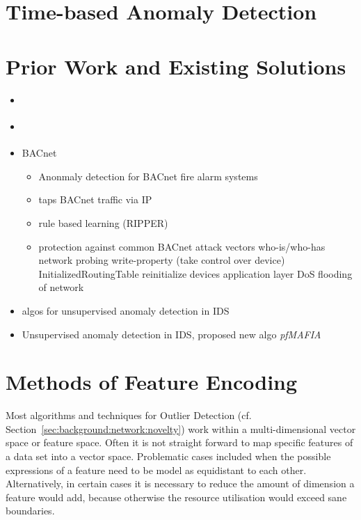 \section{Time-based Anomaly Detection}

\section{Prior Work and Existing Solutions}
\label{sec:background:network:priorwork}

\begin{itemize}
	\item \parencite{Yang2006}
	\item \parencite{Celeda2012}
	\item \textcite{Pan2014} BACnet
		\begin{itemize}
			\item Anonmaly detection for BACnet fire alarm systems
			\item taps BACnet traffic via IP
			\item rule based learning (RIPPER)
			\item protection against common BACnet attack vectors
				\subitem who-is/who-has network probing
				\subitem write-property (take control over device)
				\subitem InitializedRoutingTable
				\subitem reinitialize devices
				\subitem application layer DoS
				\subitem flooding of network
		\end{itemize}
	
	\item \textcite{Eskin2002} algos for unsupervised anomaly detection in IDS
	\item \textcite{Leung2005} Unsupervised anomaly detection in IDS, proposed new algo \emph{pfMAFIA}
\end{itemize}

\section{Methods of Feature Encoding}
\label{sec:background:network:features}

Most algorithms and techniques for Outlier Detection (cf. Section~\ref{sec:background:network:novelty}) work within a multi-dimensional vector space or feature space. Often it is not straight forward to map specific features of a data set into a vector space.
Problematic cases included when the possible expressions of a feature need to be model as equidistant to each other.
Alternatively, in certain cases it is necessary to reduce the amount of dimension a feature would add, because otherwise the resource utilisation would exceed sane boundaries.


